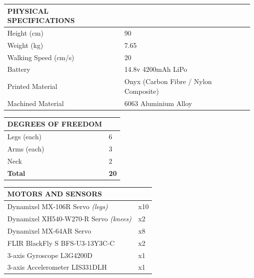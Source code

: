 \documentclass[10pt,a4paper]{article}
\begin{document}
\begin{multicols}{2}
\begin{table}[H]
	\begin{tabular}{|m{4cm}|m{2.8cm}|}
		\hline
		\rowcolor[rgb]{0.0, 0.0, 0.0}
		{\color{textcolour}\textbf{{PHYSICAL SPECIFICATIONS}}} & \\
		\hline
		Height (cm) & 90 \\
		\hline
		Weight (kg) & 7.65 \\
		\hline
		Walking Speed (cm/s) & 20 \\
		\hline
		Battery & 14.8v 4200mAh LiPo \\
		\hline
		Printed Material & Onyx (Carbon Fibre / Nylon Composite) \\
		\hline
		Machined Material & 6063 Aluminium Alloy \\
		\hline		
	\end{tabular}
\end{table}

\begin{table}[H]
	\begin{tabular}{|m{5.9cm}|m{1.25cm}|}
		\hline
		\rowcolor[rgb]{0.0, 0.0, 0.0}
		{\color{textcolour}\textbf{{DEGREES OF FREEDOM}}} & \\
		\hline
		Legs (each) & 6 \\
		\hline
		Arms (each) & 3 \\
		\hline
		Neck & 2 \\
		\hline
		\textbf{Total} & \textbf{20} \\
		\hline
	\end{tabular}
\end{table}

\begin{table}[H]
	\begin{tabular}{|m{5.9cm}|m{1.25cm}|}
		\hline
		\rowcolor[rgb]{0.0, 0.0, 0.0}
		{\color{textcolour}\textbf{{MOTORS AND SENSORS}}} & \\
		\hline
		Dynamixel MX-106R Servo \textit{(legs)} & x10 \\
		\hline
        Dynamixel XH540-W270-R Servo \textit{(knees)} & x2 \\
		\hline
		Dynamixel MX-64AR Servo & x8 \\
		\hline
		FLIR BlackFly S BFS-U3-13Y3C-C & x2 \\
		\hline
		3-axis Gyroscope L3G4200D & x1 \\
		\hline  
		3-axis Accelerometer LIS331DLH & x1 \\
		\hline
	\end{tabular}
\end{table}


\end{multicols}
\end{document}
